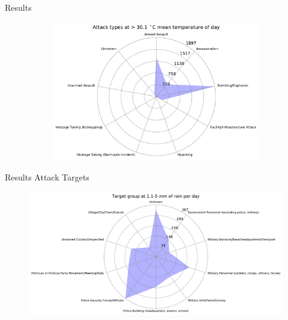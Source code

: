 \documentclass{beamer}
\begin{document}
\begin{frame}{Results}
\begin{figure}
\begin{subfigure}[b]{0.3\textwidth}
		\end{subfigure}
		\begin{subfigure}[b]{0.3\textwidth}
			\includegraphics[width=\textwidth]{Temp-Attack/temp>301_starDiagram}
		\end{subfigure}
	\end{figure}
	
\end{frame}

\begin{frame}{Results}
	Attack Targets
	
	\begin{figure}
		\includegraphics[width=\textwidth]{Rain-Target/rain11-5_starDiagram}
	\end{figure}
	
\end{frame}
\end{document}
